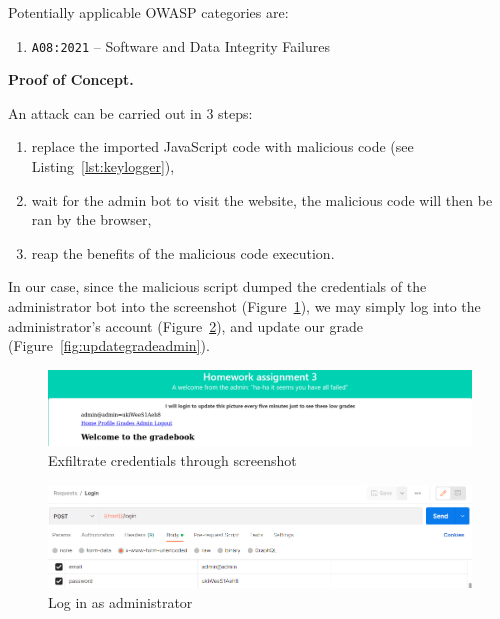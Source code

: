 \documentclass[parskip=half]{scrartcl}
\newcommand{\figref}[1]{Figure~\ref{#1}}
\begin{document}
Potentially applicable OWASP categories are:
\begin{enumerate}
  \item \texttt{A08:2021} -- Software and Data Integrity Failures
\end{enumerate}

\textbf{Proof of Concept.}

An attack can be carried out in $3$ steps:
\begin{enumerate}
    \item replace\footnotemark{} the imported JavaScript code with malicious
    code (see Listing~\ref{lst:keylogger}),
    \item wait for the admin bot to visit the website, the malicious code will
    then be ran by the browser,
    \item reap the benefits of the malicious code execution.
\end{enumerate}

In our case, since the malicious script dumped the credentials of the
administrator bot into the screenshot (\figref{fig:displaypwd}), we may simply
log into the administrator's account (\figref{fig:adminlogin}), and update our
grade (\figref{fig:updategradeadmin}).

\begin{figure}[h]
    \centering
    \includegraphics[width=\textwidth]{display_pwd}
    \caption{Exfiltrate credentials through screenshot}
    \label{fig:displaypwd}
\end{figure}

\begin{figure}[h]
    \centering
    \includegraphics[width=\textwidth]{adminlogin}
    \caption{Log in as administrator}
    \label{fig:adminlogin}
\end{figure}
\end{document}
